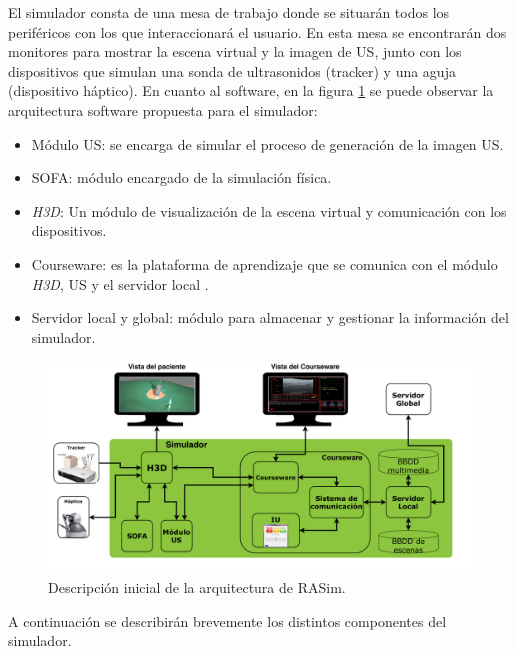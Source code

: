 El simulador consta de una mesa de trabajo donde se situarán todos los periféricos con los que interaccionará el usuario. En esta mesa se encontrarán dos monitores para mostrar la escena virtual y la imagen de \ac{US}, junto con los dispositivos que simulan una sonda de ultrasonidos (\ac{tracker}) y una aguja (dispositivo háptico). En cuanto al software, en la figura \ref{fig:coursearq} se puede observar la arquitectura software propuesta para el simulador: 
\begin{itemize}

    \item Módulo US: se encarga de simular el proceso de generación de la imagen \ac{US}.
    \item \acs{SOFA}: módulo encargado de la simulación física.
    \item \emph{H3D}: Un módulo de visualización de la escena virtual y comunicación con los dispositivos.
    \item \acs{Courseware}: es la plataforma de aprendizaje que se comunica con el módulo \emph{H3D}, \ac{US} y el servidor local .
    \item Servidor local y global: módulo para almacenar y gestionar la información del simulador.
\end{itemize}

\begin{figure}[h]
    \centering
    \includegraphics[width=\textwidth]{IMG/RasimArq.pdf}
    \caption{Descripción inicial de la arquitectura de \ac{RASim}.}
    \label{fig:coursearq}
\end{figure}


A continuación se describirán brevemente los distintos componentes del simulador.




